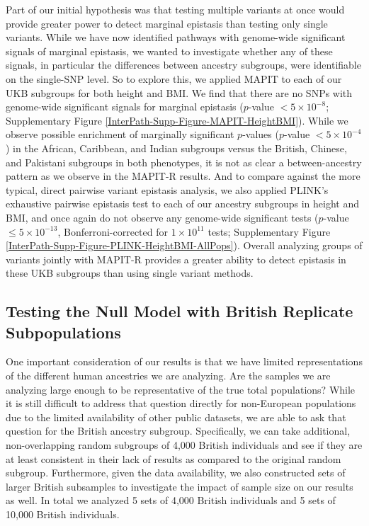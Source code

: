 \documentclass[12pt,a4paper]{article}
\begin{document}
Part of our initial hypothesis was that testing multiple variants at once would provide greater power to detect marginal epistasis than testing only single variants. While we have now identified pathways with genome-wide significant signals of marginal epistasis, we wanted to investigate whether any of these signals, in particular the differences between ancestry subgroups, were identifiable on the single-SNP level. So to explore this, we applied MAPIT to each of our UKB subgroups for both height and BMI. We find that there are no SNPs with genome-wide significant signals for marginal epistasis ($p$-value $< 5\times10^{-8}$; Supplementary Figure \ref{InterPath-Supp-Figure-MAPIT-HeightBMI}). While we observe possible enrichment of marginally significant $p$-values ($p$-value $< 5\times10^{-4}$) in the African, Caribbean, and Indian subgroups versus the British, Chinese, and Pakistani subgroups in both phenotypes, it is not as clear a between-ancestry pattern as we observe in the MAPIT-R results. And to compare against the more typical, direct pairwise variant epistasis analysis, we also applied PLINK's exhaustive pairwise epistasis test \citep{Purcell2007} to each of our ancestry subgroups in height and BMI, and once again do not observe any genome-wide significant tests ($p$-value $\leq 5\times10^{-13}$, Bonferroni-corrected for $1\times10^{11}$ tests; Supplementary Figure \ref{InterPath-Supp-Figure-PLINK-HeightBMI-AllPops}). Overall analyzing groups of variants jointly with MAPIT-R provides a greater ability to detect epistasis in these UKB subgroups than using single variant methods. 

\subsection{Testing the Null Model with British Replicate Subpopulations}

One important consideration of our results is that we have limited representations of the different human ancestries we are analyzing. Are the samples we are analyzing large enough to be representative of the true total populations? While it is still difficult to address that question directly for non-European populations due to the limited availability of other public datasets, we are able to ask that question for the British ancestry subgroup. Specifically, we can take additional, non-overlapping random subgroups of 4,000 British individuals and see if they are at least consistent in their lack of results as compared to the original random subgroup. Furthermore, given the data availability, we also constructed sets of larger British subsamples to investigate the impact of sample size on our results as well. In total we analyzed 5 sets of 4,000 British individuals and 5 sets of 10,000 British individuals. 
\end{document}
